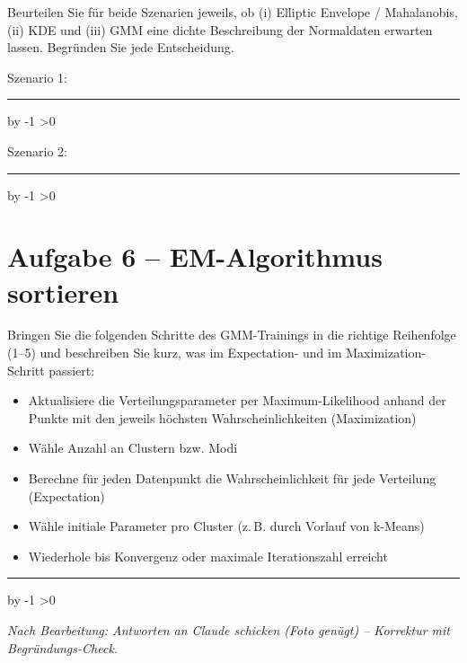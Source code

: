 \documentclass[10pt,a4paper]{article}
\newcommand{\antwortlinien}[1]{%
  \par\vspace{2pt}%
  \newcount\zeilen \zeilen=#1
  \loop
    \noindent\rule{\linewidth}{0.4pt}\par\vspace{11pt}%
    \advance\zeilen by -1
  \ifnum\zeilen>0 \repeat
}
\begin{document}
Beurteilen Sie für beide Szenarien jeweils, ob (i) Elliptic Envelope / Mahalanobis,
(ii) KDE und (iii) GMM eine dichte Beschreibung der Normaldaten erwarten lassen.
Begründen Sie jede Entscheidung.

Szenario 1:
\antwortlinien{4}

Szenario 2:
\antwortlinien{4}

\section*{Aufgabe 6 -- EM-Algorithmus sortieren}

Bringen Sie die folgenden Schritte des GMM-Trainings in die richtige Reihenfolge
(1--5) und beschreiben Sie kurz, was im Expectation- und im Maximization-Schritt passiert:

\begin{itemize}
  \item[$\square$] Aktualisiere die Verteilungsparameter per Maximum-Likelihood anhand der
  Punkte mit den jeweils höchsten Wahrscheinlichkeiten (Maximization)
  \item[$\square$] Wähle Anzahl an Clustern bzw. Modi
  \item[$\square$] Berechne für jeden Datenpunkt die Wahrscheinlichkeit für jede Verteilung
  (Expectation)
  \item[$\square$] Wähle initiale Parameter pro Cluster (z.\,B. durch Vorlauf von k-Means)
  \item[$\square$] Wiederhole bis Konvergenz oder maximale Iterationszahl erreicht
\end{itemize}
\antwortlinien{3}

\vspace{10pt}
\begin{center}
\footnotesize\itshape
Nach Bearbeitung: Antworten an Claude schicken (Foto genügt) -- Korrektur mit Begründungs-Check.
\end{center}
\end{document}
